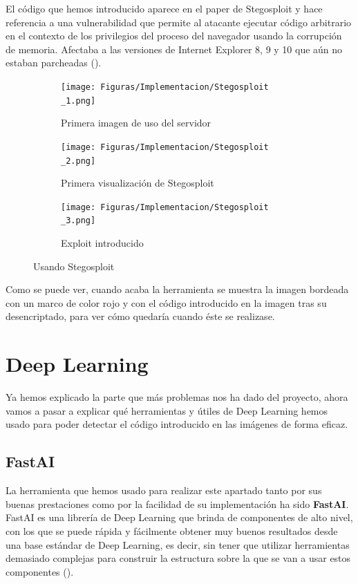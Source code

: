 El código que hemos introducido aparece en el paper de Stegosploit y hace referencia a una vulnerabilidad que permite al atacante ejecutar código arbitrario en el contexto de los privilegios del proceso del navegador usando la corrupción de memoria. Afectaba a las versiones de Internet Explorer 8, 9 y 10 que aún no estaban parcheadas (\cite{CVE-2014-0282}). %

\begin{figure}[H]
  \centering
  \begin{subfigure}[H]{0.45\linewidth}
  	\texttt{[image: Figuras/Implementacion/Stegosploit\\\_1.png]}
  	\label{fig:stegosploit-uso}
  	\caption{Primera imagen de uso del servidor}
  \end{subfigure}
  \begin{subfigure}[H]{0.45\linewidth}
  	\texttt{[image: Figuras/Implementacion/Stegosploit\\\_2.png]}
  	\label{fig:stegosploit-uso-2}
  	\caption{Primera visualización de Stegosploit}
  \end{subfigure}
  \begin{subfigure}[H]{0.60\linewidth}
  	\texttt{[image: Figuras/Implementacion/Stegosploit\\\_3.png]}
  	\label{fig:stegosploit-uso-3}
  	\caption{Exploit introducido}
  \end{subfigure}
  \caption{Usando Stegosploit}
\end{figure}

Como se puede ver, cuando acaba la herramienta se muestra la imagen bordeada con un marco de color rojo y con el código introducido en la imagen tras su desencriptado, para ver cómo quedaría cuando éste se realizase.

\section{Deep Learning}
\label{sec:fastai}

Ya hemos explicado la parte que más problemas nos ha dado del proyecto, ahora vamos a pasar a explicar qué herramientas y útiles de Deep Learning hemos usado para poder detectar el código introducido en las imágenes de forma eficaz.

\subsection{FastAI}

La herramienta que hemos usado para realizar este apartado tanto por sus buenas prestaciones como por la facilidad de su implementación ha sido \textbf{FastAI}. FastAI es una librería de Deep Learning que brinda de componentes de alto nivel, con los que se puede rápida y fácilmente obtener muy buenos resultados desde una base estándar de Deep Learning, es decir, sin tener que utilizar herramientas demasiado complejas para construir la estructura sobre la que se van a usar estos componentes (\cite{fastai}). %

